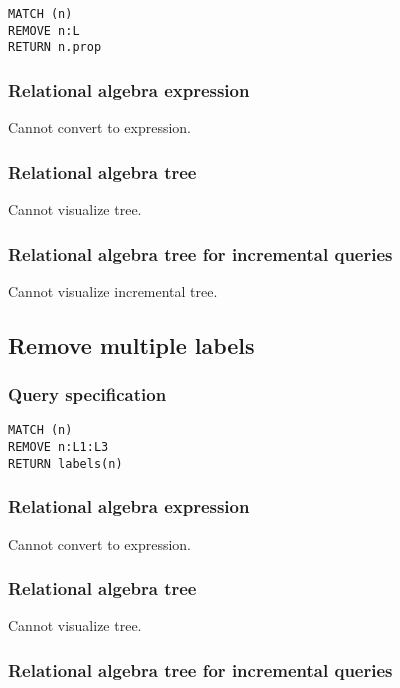 \begin{lstlisting}
MATCH (n)
REMOVE n:L
RETURN n.prop
\end{lstlisting}

\subsubsection*{Relational algebra expression}

Cannot convert to expression.

\subsubsection*{Relational algebra tree}

Cannot visualize tree.

\subsubsection*{Relational algebra tree for incremental queries}

Cannot visualize incremental tree.

\subsection{Remove multiple labels}

\subsubsection*{Query specification}

\begin{lstlisting}
MATCH (n)
REMOVE n:L1:L3
RETURN labels(n)
\end{lstlisting}

\subsubsection*{Relational algebra expression}

Cannot convert to expression.

\subsubsection*{Relational algebra tree}

Cannot visualize tree.

\subsubsection*{Relational algebra tree for incremental queries}

